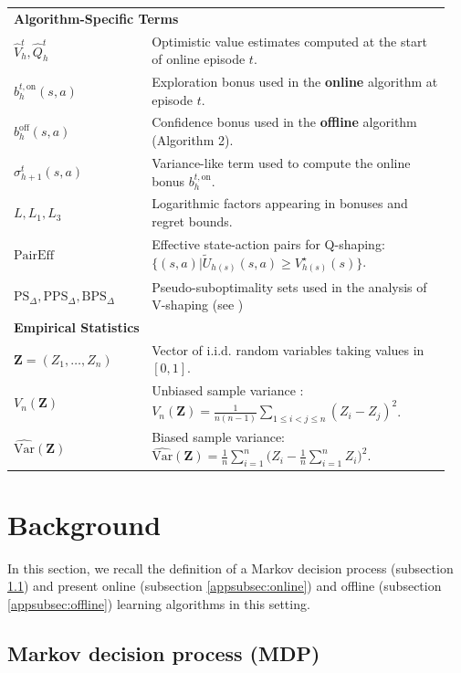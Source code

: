 \documentclass[twoside]{article}
\newcommand{\on}{\mathrm{on}} %
\newcommand{\off}{\mathrm{off}} %
\newcommand{\boff}{b_h^{\off}} %
\newcommand{\bont}{b_h^{t,\on}} %
\newcommand{\BPS}{\mathrm{BPS}_{\Delta}} %
\newcommand{\PPS}{\mathrm{PPS}_{\Delta}} %
\newcommand{\PS}{\mathrm{PS}_{\Delta}} %
\newcommand{\highq}{\widetilde{U}} %
\begin{document}
\begin{longtable}{@{}p{0.3\linewidth}p{0.65\linewidth}@{}}
\multicolumn{2}{l}{\textbf{Algorithm-Specific Terms}} \\[2pt]
$\widehat{V}_h^t, \widehat{Q}_h^t$ & Optimistic value estimates computed at the start of online episode $t$. \\
$\bont(s,a)$ & Exploration bonus used in the \textbf{online} algorithm at episode $t$. \\
$\boff(s,a)$ & Confidence bonus used in the \textbf{offline} algorithm (Algorithm 2). \\
$\sigma_{h+1}^t(s,a)$ & Variance-like term used to compute the online bonus $\bont$. \\
$L, L_1, L_3$ & Logarithmic factors appearing in bonuses and regret bounds. \\
$\mathrm{PairEff}$ & Effective state-action pairs for Q-shaping: $\{(s,a) | \highq_{h(s)}(s,a) \ge V^\star_{h(s)}(s)\}$. \\
$\PS, \PPS, \BPS$ & Pseudo-suboptimality sets used in the analysis of V-shaping (see \cite{gupta_unpacking_2022}) \\

\multicolumn{2}{l}{\textbf{Empirical Statistics}} \\[2pt]
$\mathbf{Z} = (Z_1, \dots, Z_n)$ & Vector of i.i.d. random variables taking values in $[0,1]$. \\
$V_n(\mathbf{Z})$ & Unbiased sample variance : $\displaystyle V_n(\mathbf{Z}) = \frac{1}{n(n-1)}\sum_{1 \le i < j \le n}(Z_i - Z_j)^2$. \\[6pt]
$\widehat{\mathrm{Var}}(\mathbf{Z})$ & Biased sample variance: $\displaystyle \widehat{\mathrm{Var}}(\mathbf{Z}) = \frac{1}{n}\sum_{i=1}^n \Big(Z_i - \frac{1}{n}\sum_{i=1}^n Z_i\Big)^2$. \\
\bottomrule
\end{longtable}
\section{Background}

In this section, we recall the definition of a Markov decision process (subsection \ref{appsubsec:MDP}) and present online (subsection \ref{appsubsec:online}) and offline (subsection \ref{appsubsec:offline}) learning algorithms in this setting.

\subsection{Markov decision process (MDP)}\label{appsubsec:MDP}
\end{document}
